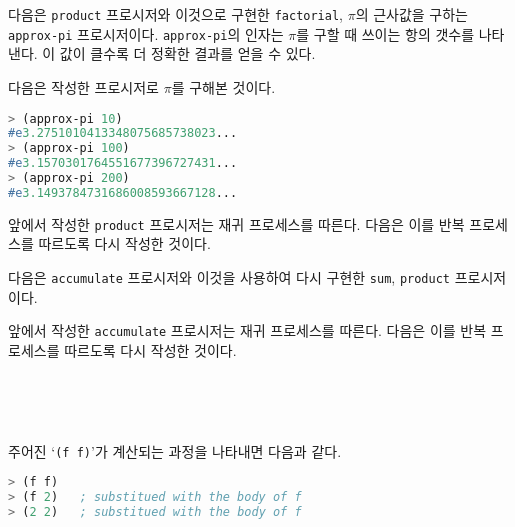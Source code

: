 
\begin{MyEnum}
\item 다음은 \texttt{product} 프로시저와 이것으로 구현한 \texttt{factorial},
  $\pi$의 근사값을 구하는 \texttt{approx-pi}
  프로시저이다. \texttt{approx-pi}의 인자는 $\pi$를 구할 때 쓰이는 항의 갯수를
  나타낸다. 이 값이 클수록 더 정확한 결과를 얻을 수 있다.

  다음은 작성한 프로시저로 $\pi$를 구해본 것이다.
  \begin{lstlisting}[language=Scheme]
> (approx-pi 10)
#e3.2751010413348075685738023...
> (approx-pi 100)
#e3.1570301764551677396727431...
> (approx-pi 200)
#e3.1493784731686008593667128...
  \end{lstlisting}
\item 앞에서 작성한 \texttt{product} 프로시저는 재귀 프로세스를 따른다. 다음은
  이를 반복 프로세스를 따르도록 다시 작성한 것이다.
\end{MyEnum}

\begin{MyEnum}
\item  다음은 \texttt{accumulate} 프로시저와 이것을 사용하여 다시 구현한
  \texttt{sum}, \texttt{product} 프로시저이다.
\item 앞에서 작성한 \texttt{accumulate} 프로시저는 재귀 프로세스를
  따른다. 다음은 이를 반복 프로세스를 따르도록 다시 작성한 것이다.
\end{MyEnum}

\begin{MyEnum}
\item \ 
\item \ 
\end{MyEnum}


주어진 `\texttt{(f f)}'가 계산되는 과정을 나타내면 다음과 같다.

\begin{lstlisting}[language=Scheme]
> (f f)
> (f 2)   ; substitued with the body of f
> (2 2)   ; substitued with the body of f
\end{lstlisting}

